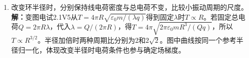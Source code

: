 \documentclass[UTF8,fontset=fandol,a4paper,11pt]{ctexart}
\begin{document}
\begin{enumerate}
\item 改变环半径时，分别保持线电荷密度与总电荷不变，比较小振动周期的尺度。
\textbf{解：}变图电试2.1V5从$T=4\pi R\sqrt{\varepsilon_0m/(\lambda q)}$得到固定$\lambda$时$T\propto R$。若固定总电荷$Q=2\pi R\lambda$，代入$\lambda=Q/(2\pi R)$，得$T=4\pi\sqrt{2\pi\varepsilon_0mR^3/(Qq)}$，所以$T\propto R^{3/2}$。半径加倍时两种周期比分别为2和$2\sqrt2$。图中曲线按同一个参考半径归一化，体现改变半径时电荷条件也参与确定场梯度。
\begin{center}\begin{minipage}{.98\linewidth}\centering
{}
\end{minipage}
\end{center}
\end{enumerate}
\end{document}
